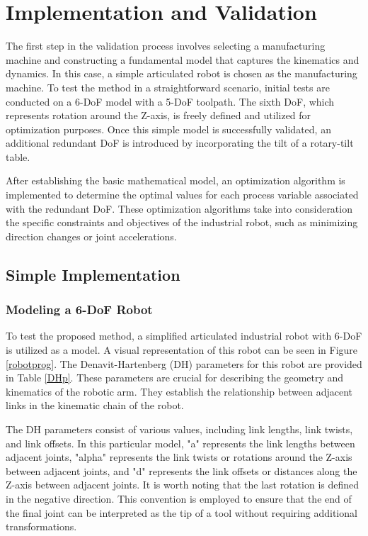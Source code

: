 \chapter{Implementation and Validation}%

The first step in the validation process involves selecting a manufacturing machine and constructing a fundamental model that captures the kinematics and dynamics. In this case, a simple articulated robot is chosen as the manufacturing machine. To test the method in a straightforward scenario, initial tests are conducted on a 6-\acrshort{DoF} model with a 5-\acrshort{DoF} toolpath. The sixth \acrshort{DoF}, which represents rotation around the Z-axis, is freely defined and utilized for optimization purposes. Once this simple model is successfully validated, an additional redundant \acrshort{DoF} is introduced by incorporating the tilt of a rotary-tilt table.

After establishing the basic mathematical model, an optimization algorithm is implemented to determine the optimal values for each process variable associated with the redundant \acrshort{DoF}. These optimization algorithms take into consideration the specific constraints and objectives of the industrial robot, such as minimizing direction changes or joint accelerations.



\section{Simple Implementation}%
\subsection{Modeling a 6-DoF Robot}
To test the proposed method, a simplified articulated industrial robot with 6-\acrshort{DoF} is utilized as a model. A visual representation of this robot can be seen in Figure \ref{robotprog}. The Denavit-Hartenberg (\acrshort{DH}) parameters for this robot are provided in Table \ref{DHp}. These parameters are crucial for describing the geometry and kinematics of the robotic arm. They establish the relationship between adjacent links in the kinematic chain of the robot.

The \acrshort{DH} parameters consist of various values, including link lengths, link twists, and link offsets. In this particular model, "a" represents the link lengths between adjacent joints, "alpha" represents the link twists or rotations around the Z-axis between adjacent joints, and "d" represents the link offsets or distances along the Z-axis between adjacent joints. It is worth noting that the last rotation is defined in the negative direction. This convention is employed to ensure that the end of the final joint can be interpreted as the tip of a tool without requiring additional transformations.

